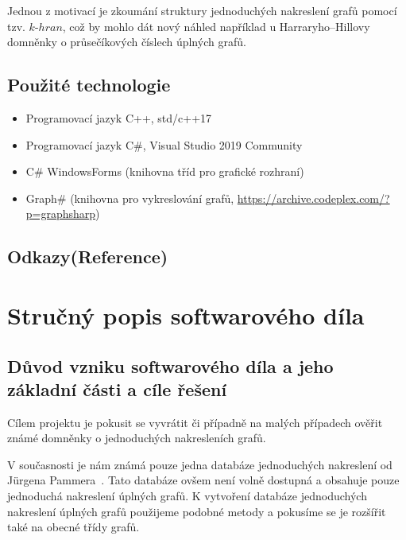 \documentclass{article}
\begin{document}
Jednou z motivací je zkoumání struktury jednoduchých nakreslení grafů pomocí tzv. $k$-$hran$, což by mohlo dát nový náhled například u Harraryho--Hillovy domněnky o průsečíkových číslech úplných grafů.


\subsection{Použité technologie}

\begin{itemize}
    \item Programovací jazyk C++, std/c++17
    \item Programovací jazyk C\#, Visual Studio 2019 Community
    \item C\# WindowsForms (knihovna tříd pro grafické rozhraní)
    \item Graph\# (knihovna pro vykreslování grafů, \url{https://archive.codeplex.com/?p=graphsharp})
\end{itemize}

\subsection{Odkazy(Reference)}

\nocite{monotone}
\nocite{mastersthesis}  
\printbibliography[heading=none]

\section{Stručný popis softwarového díla}

\subsection{Důvod vzniku softwarového díla a jeho základní části a cíle řešení}

Cílem projektu je pokusit se vyvrátit či případně na malých případech ověřit známé domněnky o jednoduchých nakresleních grafů.

V současnosti je nám známá pouze jedna databáze jednoduchých nakreslení od J{\" u}rgena Pammera~\cite{mastersthesis}. Tato databáze ovšem není volně dostupná a obsahuje pouze jednoduchá nakreslení úplných grafů. K vytvoření databáze jednoduchých nakreslení úplných grafů použijeme podobné metody a pokusíme se je rozšířit také na obecné třídy grafů.
\end{document}
